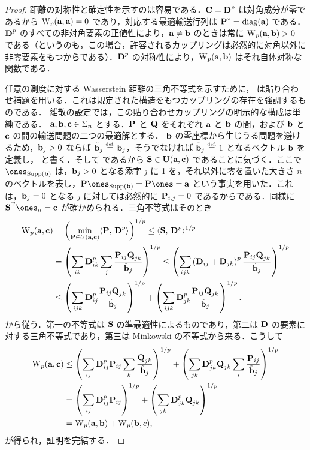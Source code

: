 \begin{proof}
距離の対称性と確定性を示すのは容易である．$\C = \distD^p$ は対角成分が零であるから $\WassD_p(\a,\a)=0$ であり，対応する最適輸送行列は $\P^\star=\diag(\a)$ である．$\distD^p$ のすべての非対角要素の正値性により，$\a\ne \b$ のときは常に $\WassD_p(\a,\b)>0$ である（というのも，この場合，許容されるカップリングは必然的に対角以外に非零要素をもつからである）．$\distD^p$ の対称性により，$\WassD_p(\a,\b)$ はそれ自体対称な関数である．


任意の測度に対する Wasserstein 距離の三角不等式を示すために，\citet[Theorem 7.3]{Villani03} は貼り合わせ補題を用いる．これは規定された構造をもつカップリングの存在を強調するものである．
離散の設定では，この貼り合わせカップリングの明示的な構成は単純である．
%
$\a,\b,\VectMode{c} \in\simplex_n$ とする．$\P$ と $\Q$ をそれぞれ $\a$ と $\b$ の間，および $\b$ と $\VectMode{c}$ の間の輸送問題の二つの最適解とする．
%
$\b$ の零座標から生じうる問題を避けるため，$\b_j>0$ ならば $\tilde\b_j \eqdef \b_j$，そうでなければ $\tilde{\b}_j\eqdef 1$ となるベクトル $\tilde{\b}$ を定義し，
と書く．そして
であるから $\SS \in \CouplingsD(\a,\VectMode{c})$ であることに気づく．ここで $\ones_{\Supp(\b)}$ は，$\b_j>0$ となる添字 $j$ に 1 を，それ以外に零を置いた大きさ $n$ のベクトルを表し，$\P \ones_{\Supp(\b)} = \P \ones = \a$ という事実を用いた．これは，$\b_j=0$ となる $j$ に対しては必然的に $\P_{i,j} = 0$ であるからである．同様に $\transp{\SS} \ones_n = \VectMode{c}$ が確かめられる．三角不等式はそのとき
\begin{align*}
\WassD_p(\a,\VectMode{c})&=\left(\min_{\P\in U(\a,\VectMode{c})}\dotp{\P}{\distD^p}\right)^{1/p} \leq \dotp{\SS}{\distD^p}^{1/p}\\
&= \left(\sum_{ik} \distD^p_{ik}\sum_{j} \frac{\P_{ij}\Q_{jk}}{\tilde{\b}_j}\right)^{1/p} \leq \left(\sum_{ijk} \left(\distD_{ij}+\distD_{jk}\right)^p \frac{\P_{ij}\Q_{jk}}{\tilde{\b}_j}\right)^{1/p} \\
& \leq \left(\sum_{ijk} \distD^p_{ij} \frac{\P_{ij}\Q_{jk}}{\tilde{\b}_j}\right)^{1/p} + \left(\sum_{ijk}\distD^p_{jk} \frac{\P_{ij}\Q_{jk}}{\tilde{\b}_j}\right)^{1/p}.
\end{align*}
から従う．第一の不等式は $\SS$ の準最適性によるものであり，第二は $\distD$ の要素に対する三角不等式であり，第三は Minkowski の不等式から来る．こうして
\begin{align*}
\WassD_p(\a,\VectMode{c})& \leq \left(\sum_{ij} \distD^p_{ij}\P_{ij} \sum_k \frac{\Q_{jk}}{\tilde{\b}_j}\right)^{1/p} + \left(\sum_{jk} \distD^p_{jk} \Q_{jk} \sum_i \frac{\P_{ij}}{\tilde{\b}_j}\right)^{1/p}\\
&= \left(\sum_{ij} \distD^p_{ij}\P_{ij}\right)^{1/p} + \left(\sum_{jk} \distD^p_{jk} \Q_{jk}\right)^{1/p}\\
&= \WassD_p(\a,\b) +\WassD_p(\b,\c),
\end{align*}
が得られ，証明を完結する．
\end{proof}


